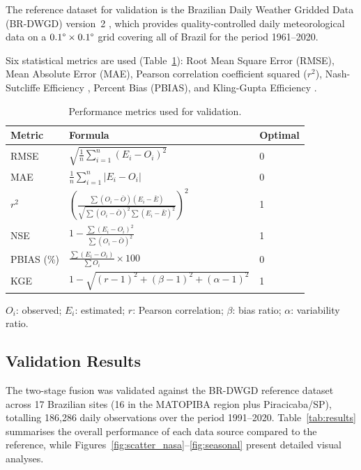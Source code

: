 \documentclass[preprint,review,12pt]{elsarticle}
\begin{document}
The reference dataset for validation is the Brazilian Daily Weather Gridded
Data (BR-DWGD) version~2 \citep{Xavier2016, Xavier2022}, which provides quality-controlled
daily meteorological data on a $0.1\text{\textdegree{}} \times 0.1\text{\textdegree{}}$
grid covering all of Brazil for the period 1961--2020.

Six statistical metrics are used (Table~\ref{tab:metrics_def}): Root Mean Square
Error (RMSE), Mean Absolute Error (MAE), Pearson correlation coefficient squared
($r^2$), Nash-Sutcliffe Efficiency \citep[NSE;][]{Nash1970}, Percent Bias (PBIAS),
and Kling-Gupta Efficiency \citep[KGE;][]{Gupta2009}.

\begin{table}[htbp]
\centering
\caption{Performance metrics used for validation.}
\label{tab:metrics_def}
\small
\begin{tabular}{@{}lll@{}}
\toprule
Metric & Formula & Optimal \\
\midrule
RMSE & $\sqrt{\frac{1}{n}\sum_{i=1}^{n}(E_i - O_i)^2}$ & 0 \\[6pt]
MAE & $\frac{1}{n}\sum_{i=1}^{n}|E_i - O_i|$ & 0 \\[6pt]
$r^2$ & $\left(\frac{\sum(O_i-\bar{O})(E_i-\bar{E})}{\sqrt{\sum(O_i-\bar{O})^2\sum(E_i-\bar{E})^2}}\right)^2$ & 1 \\[6pt]
NSE & $1 - \frac{\sum(E_i - O_i)^2}{\sum(O_i - \bar{O})^2}$ & 1 \\[6pt]
PBIAS (\%) & $\frac{\sum(E_i - O_i)}{\sum O_i} \times 100$ & 0 \\[6pt]
KGE & $1 - \sqrt{(r-1)^2 + (\beta-1)^2 + (\alpha-1)^2}$ & 1 \\
\bottomrule
\end{tabular}
\begin{flushleft}
\small $O_i$: observed; $E_i$: estimated; $r$: Pearson correlation;
$\beta$: bias ratio; $\alpha$: variability ratio.
\end{flushleft}
\end{table}


\subsection{Validation Results}
\label{subsec:results}

The two-stage fusion was validated against the BR-DWGD reference dataset
\citep{xavier2022} across 17 Brazilian sites (16 in the MATOPIBA region
plus Piracicaba/SP), totalling 186{,}286 daily observations over the period
1991--2020. Table~\ref{tab:results} summarises the overall performance of
each data source compared to the reference, while Figures~\ref{fig:scatter_nasa}--\ref{fig:seasonal} present detailed visual analyses.
\end{document}
